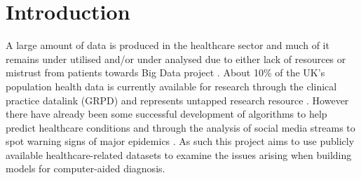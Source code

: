 \chapter{Introduction}\label{ch:Introduction}
 \setcounter{page}{1}

A large amount of data is produced in the healthcare sector \citep{EMC:2014ve} and much of it remains under utilised and/or under analysed due to either lack of resources \citep{Raghupathi:2014ek} or mistrust from patients towards Big Data project \citep{Goldacre:tf,bcs:2017tl}. About 10\% of the UK's population health data is currently available for research through the clinical practice datalink (GRPD) and represents untapped research resource \citep{Kousoulis:2015ti}. However there have already been some successful development of algorithms to help predict healthcare conditions \citep{Bellon:2013um} and through the analysis of social media streams to spot warning signs of major epidemics \citep{Kostkova:2016ur}.\newline
As such this project aims to use publicly available healthcare-related datasets to examine the issues arising when building models for computer-aided diagnosis.\newline

